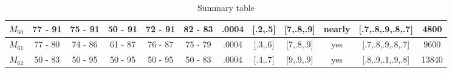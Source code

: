 \begin{table}[H]
{\begin{tabular}{|c|c|c|c|c|c|c|c|c|c|c|c|}
\rowcolor[HTML]{FFFFFF} 
$M_{60}$                                                                             & 77 - 91                                 & 75 - 91                                 & 50 - 91                                 & 72 - 91                                 & 82 - 83                                 & .0004                                                                                   & {[}.2,.5{]}                                                                                 & {[}7,.8,.9{]}                                                                               & nearly                                                                                    & {[}.7,.8,.9,.8,.7{]}                                                                    & 4800                                                                                      \\ \hline
\rowcolor[HTML]{FFFFFF} 
$M_{61}$                                                                             & 77 - 80                                 & 74 - 86                                 & 61 - 87                                 & 76 - 87                                 & 75 - 79                                 & .0004                                                                                   & {[}.3,.6{]}                                                                                 & {[}7,.8,.9{]}                                                                               & yes                                                                                       & {[}.7,.8,.9,.8,.7{]}                                                                    & 9600                                                                                      \\ \hline
\rowcolor[HTML]{FFFFFF} 
$M_{62}$                                                                             & 50 - 83                                 & 50 - 95                                 & 50 - 95                                 & 50 - 95                                 & 50 - 83                                 & .0004                                                                                   & {[}.4,.7{]}                                                                                 & {[}9,.9,.9{]}                                                                               & yes                                                                                       & {[}.8,.9,.1,.9,.8{]}                                                                    & 13840                                                                                     \\ \hline
\end{tabular}
}
\caption{Summary table}
\label{tab:summary_table_6}
\end{table}